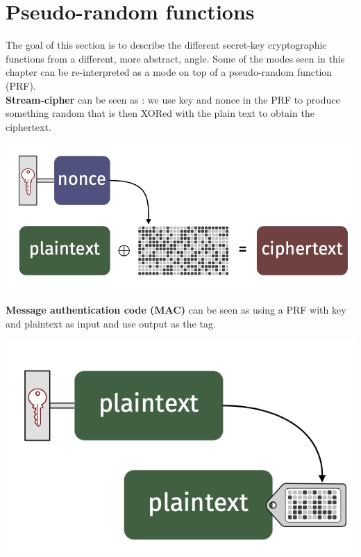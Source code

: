 \documentclass[11pt,a4paper]{report}
\begin{document}
\section{Pseudo-random functions}
The goal of this section is to describe the different secret-key cryptographic functions from a different, more abstract, angle. Some of the modes seen in this chapter can be re-interpreted as a mode on top of a pseudo-random function (PRF).\\

\textbf{Stream-cipher} can be seen as : we use key and nonce in the PRF to produce something random that is then XORed with the plain text to obtain the ciphertext.
\begin{center}
\includegraphics[scale=0.4]{img/img16.png}
\end{center}

\textbf{Message authentication code (MAC)} can be seen as using a PRF with key and plaintext as input and use output as the tag.
\begin{center}
\includegraphics[scale=0.4]{img/img17.png}
\end{center}
\end{document}
